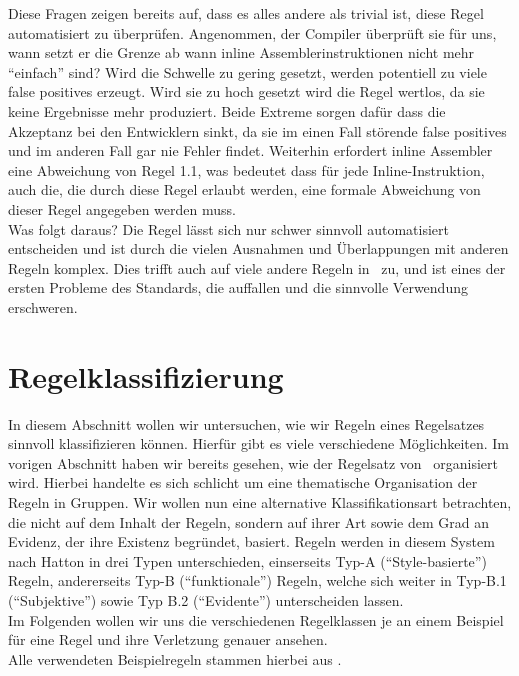\documentclass[a4paper,UKenglish,cleveref, autoref]{templates/lipics-v2019}
\begin{document}
    Diese Fragen zeigen bereits auf, dass es alles andere als trivial ist, diese Regel automatisiert zu überprüfen.
    Angenommen, der Compiler überprüft sie für uns, wann setzt er die Grenze ab wann inline Assemblerinstruktionen
    nicht mehr \enquote{einfach} sind?
    Wird die Schwelle zu gering gesetzt, werden potentiell zu viele false positives erzeugt.
    Wird sie zu hoch gesetzt wird die Regel wertlos, da sie keine Ergebnisse mehr produziert.
    Beide Extreme sorgen dafür dass die Akzeptanz bei den Entwicklern sinkt, da sie im einen Fall störende false positives
    und im anderen Fall gar nie Fehler findet.
    Weiterhin erfordert inline Assembler eine Abweichung von Regel 1.1, was bedeutet dass für jede Inline-Instruktion,
    auch die, die durch diese Regel erlaubt werden, eine formale Abweichung von dieser Regel angegeben werden muss.\\
    Was folgt daraus?
    Die Regel lässt sich nur schwer sinnvoll automatisiert entscheiden und ist durch die vielen Ausnahmen und Überlappungen
    mit anderen Regeln komplex.
    Dies trifft auch auf viele andere Regeln in \misra\ zu, und ist eines der ersten Probleme des Standards, die auffallen
    und die sinnvolle Verwendung erschweren.

    \section{Regelklassifizierung}
    \label{sec:regelklassifizierung}
    In diesem Abschnitt wollen wir untersuchen, wie wir Regeln eines Regelsatzes sinnvoll klassifizieren können.
    Hierfür gibt es viele verschiedene Möglichkeiten.
    Im vorigen Abschnitt haben wir bereits gesehen, wie der Regelsatz von \misra\ organisiert wird.
    Hierbei handelte es sich schlicht um eine thematische Organisation der Regeln in Gruppen.
    Wir wollen nun eine alternative Klassifikationsart betrachten, die nicht auf dem Inhalt der Regeln, sondern auf ihrer
    Art sowie dem Grad an Evidenz, der ihre Existenz begründet, basiert.
    Regeln werden in diesem System nach Hatton in drei Typen unterschieden, einserseits Typ-A (\enquote{Style-basierte}) Regeln,
    andererseits Typ-B (\enquote{funktionale}) Regeln, welche sich weiter in Typ-B.1 (\enquote{Subjektive}) sowie
    Typ B.2 (\enquote{Evidente}) unterscheiden lassen.\cite{hatton2004safer}\\
    Im Folgenden wollen wir uns die verschiedenen Regelklassen je an einem Beispiel für eine Regel und ihre Verletzung
    genauer ansehen.\\
    Alle verwendeten Beispielregeln stammen hierbei aus \misra.
\end{document}
